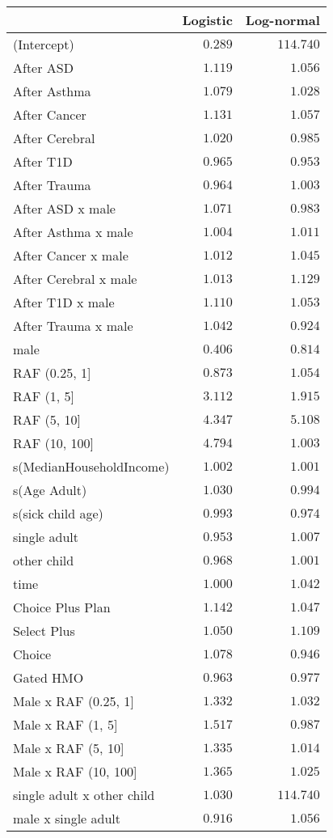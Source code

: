 \begin{table}[!tbp]
\begin{center}
\begin{tabular}{lrr}
\hline\hline
\multicolumn{1}{l}{}&\multicolumn{1}{c}{Logistic}&\multicolumn{1}{c}{Log-normal}\tabularnewline
\hline
(Intercept)&$0.289$&$114.740$\tabularnewline
After ASD&$1.119$&$  1.056$\tabularnewline
After Asthma&$1.079$&$  1.028$\tabularnewline
After Cancer&$1.131$&$  1.057$\tabularnewline
After Cerebral&$1.020$&$  0.985$\tabularnewline
After T1D&$0.965$&$  0.953$\tabularnewline
After Trauma&$0.964$&$  1.003$\tabularnewline
After ASD x male&$1.071$&$  0.983$\tabularnewline
After Asthma x male&$1.004$&$  1.011$\tabularnewline
After Cancer x male&$1.012$&$  1.045$\tabularnewline
After Cerebral  x male&$1.013$&$  1.129$\tabularnewline
After T1D x male&$1.110$&$  1.053$\tabularnewline
After Trauma x male&$1.042$&$  0.924$\tabularnewline
male&$0.406$&$  0.814$\tabularnewline
RAF (0.25, 1]&$0.873$&$  1.054$\tabularnewline
RAF (1, 5]&$3.112$&$  1.915$\tabularnewline
RAF (5, 10]&$4.347$&$  5.108$\tabularnewline
RAF (10, 100]&$4.794$&$  1.003$\tabularnewline
s(MedianHouseholdIncome)&$1.002$&$  1.001$\tabularnewline
s(Age Adult)&$1.030$&$  0.994$\tabularnewline
s(sick child age)&$0.993$&$  0.974$\tabularnewline
single adult&$0.953$&$  1.007$\tabularnewline
other child&$0.968$&$  1.001$\tabularnewline
time&$1.000$&$  1.042$\tabularnewline
Choice Plus Plan&$1.142$&$  1.047$\tabularnewline
Select Plus&$1.050$&$  1.109$\tabularnewline
Choice&$1.078$&$  0.946$\tabularnewline
Gated HMO&$0.963$&$  0.977$\tabularnewline
Male x RAF (0.25, 1]&$1.332$&$  1.032$\tabularnewline
Male x RAF (1, 5]&$1.517$&$  0.987$\tabularnewline
Male x RAF (5, 10]&$1.335$&$  1.014$\tabularnewline
Male x RAF (10, 100]&$1.365$&$  1.025$\tabularnewline
single adult x other child&$1.030$&$114.740$\tabularnewline
male x single adult&$0.916$&$  1.056$\tabularnewline
\hline
\end{tabular}\end{center}
\end{table}
